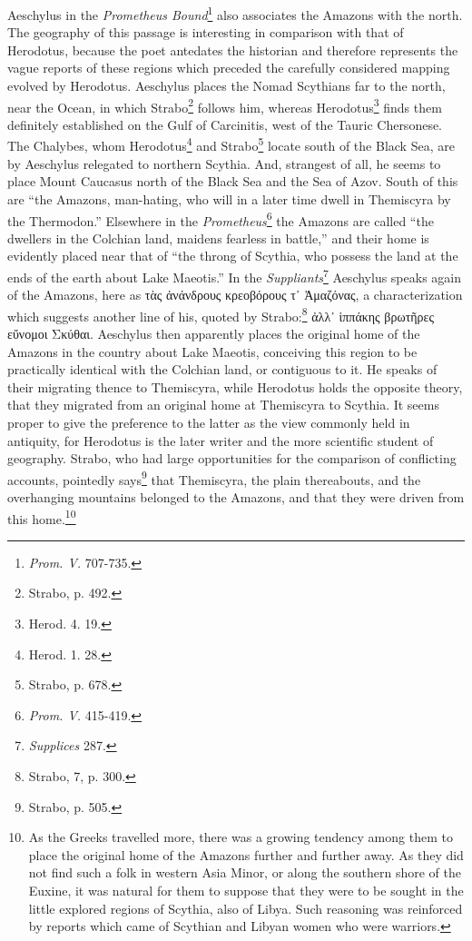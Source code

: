 \documentclass[a4paper, 12pt, oneside]{article}
\begin{document}
Aeschylus in the \emph{Prometheus Bound}\footnote{\emph{Prom. V.} 707-735.} also associates the Amazons with the north. The geography of this passage is interesting in comparison with that of Herodotus, because the poet antedates the historian and therefore represents the vague reports of these regions which preceded the carefully considered mapping evolved by Herodotus. Aeschylus places the Nomad Scythians far to the north, near the Ocean, in which Strabo\footnote{Strabo, p. 492.} follows him, whereas Herodotus\footnote{Herod. 4. 19.} finds them definitely established on the Gulf of Carcinitis, west of the Tauric Chersonese. The Chalybes, whom Herodotus\footnote{Herod. 1. 28.} and Strabo\footnote{Strabo, p. 678.} locate south of the Black Sea, are by Aeschylus relegated to northern Scythia. And, strangest of all, he seems to place Mount Caucasus north of the Black Sea and the Sea of Azov. South of this are ``the Amazons, man-hating, who will in a later time dwell in Themiscyra by the Thermodon.'' Elsewhere in the \emph{Prometheus}\footnote{\emph{Prom. V.} 415-419.} the Amazons are called ``the dwellers in the Colchian land, maidens fearless in battle,'' and their home is evidently placed near that of ``the throng of Scythia, who possess the land at the ends of the earth about Lake Maeotis.'' In the \emph{Suppliants}\footnote{\emph{Supplices} 287.} Aeschylus speaks again of the Amazons, here as τὰς ἀνάνδρους κρεοβόρους τ᾽ Ἀμαζόνας, a characterization which suggests another line of his, quoted by Strabo:\footnote{Strabo, 7, p. 300.} ἀλλ᾽ ἱππάκης βρωτῆρες εὔνομοι Σκύθαι. Aeschylus then apparently places the original home of the Amazons in the country about Lake Maeotis, conceiving this region to be practically identical with the Colchian land, or contiguous to it. He speaks of their migrating thence to Themiscyra, while Herodotus holds the opposite theory, that they migrated from an original home at Themiscyra to Scythia. It seems proper to give the preference to the latter as the view commonly held in antiquity, for Herodotus is the later writer and the more scientific student of geography. Strabo, who had large opportunities for the comparison of conflicting accounts, pointedly says\footnote{Strabo, p. 505.} that Themiscyra, the plain thereabouts, and the overhanging mountains belonged to the Amazons, and that they were driven from this home.\footnote{As the Greeks travelled more, there was a growing tendency among them to place the original home of the Amazons further and further away. As they did not find such a folk in western Asia Minor, or along the southern shore of the Euxine, it was natural for them to suppose that they were to be sought in the little explored regions of Scythia, also of Libya. Such reasoning was reinforced by reports which came of Scythian and Libyan women who were warriors.}
\end{document}
